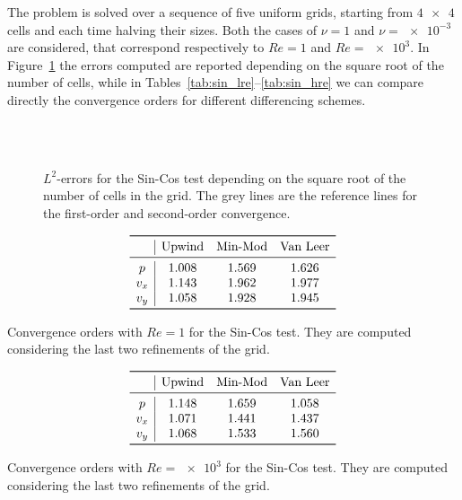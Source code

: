 The problem is solved over a sequence of five uniform grids, starting from 
$\num{4x4}$ cells and each time halving their sizes. Both the cases of $\nu=1$ 
and $\nu=\num{e-3}$ are considered, that correspond respectively to $Re=1$ and $Re=\num{e3}$. In Figure~\ref{fig:sin_err} the errors computed are reported 
depending on the square root of the number of cells, while in 
Tables~\ref{tab:sin_lre}--\ref{tab:sin_hre} we can compare directly the 
convergence orders for different differencing schemes.
\begin{figure}
	\centering
	\subfloat[Upwind, $Re = 1$]{
		}
	\subfloat[Upwind, $Re = \num{e3}$]{
		}\\
	\subfloat[Min-Mod, $Re = 1$]{
		}
	\subfloat[Min-Mod, $Re = \num{e3}$]{
		}\\
	\subfloat[Van Leer, $Re = 1$]{
		}
	\subfloat[Van Leer, $Re = \num{e3}$]{
		}
	\caption[$L^2$-errors for the Sin-Cos test]{$L^2$-errors for the Sin-Cos 
	test depending on the square root of the number of cells in the grid. 
	The grey lines are the reference lines for the first-order and second-order 
	convergence.}
	\label{fig:sin_err}
\end{figure}

\begin{table}
	\centering
	\[
	\begin{array}{c|ccc}
	\toprule
	& \text{Upwind} & \text{Min-Mod} & \text{Van Leer} \\ 
	\midrule
	p & 1.008 & 1.569 & 1.626\\
	v_x & 1.143 & 1.962 & 1.977\\
	v_y & 1.058 & 1.928 & 1.945\\
	\bottomrule
	\end{array}
	\]
	\caption[Convergence orders with $Re = 1$ for the Sin-Cos 
	test]{Convergence orders with $Re = 1$ for the Sin-Cos test. They are 
	computed considering the last two refinements of the grid.}
	\label{tab:sin_lre}
	\[
	\begin{array}{c|ccc}
	\toprule
	& \text{Upwind} & \text{Min-Mod} & \text{Van Leer} \\ 
	\midrule
	p & 1.148 & 1.659 & 1.058\\
	v_x & 1.071 & 1.441 & 1.437\\
	v_y & 1.068 & 1.533 & 1.560\\
	\bottomrule
	\end{array}
	\]
	\caption[Convergence orders with $Re = \num{e3}$ for the Sin-Cos 
	test]{Convergence orders with $Re = \num{e3}$ for the Sin-Cos test. 
	They are computed considering the last two refinements of the grid.}
	\label{tab:sin_hre}
\end{table}

